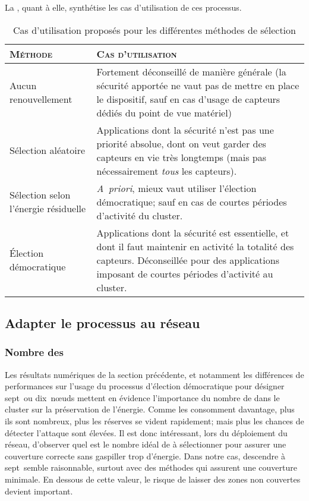 La , quant à elle, synthétise les cas d'utilisation de ces processus.
\begin{table}[ht]
    \centering
    \caption{Cas d'utilisation proposés pour les différentes méthodes de sélection}\label{sd:table:apps}
    \medskip
    \small
    \begin{tabu}{X[1,c,m] X[2,j,m]}
        \toprule
        \textsc{Méthode} & \textsc{Cas d'utilisation} \\
        \midrule
        Aucun renouvellement
            & Fortement déconseillé de manière générale (la sécurité apportée ne vaut pas de mettre en place le dispositif, sauf en cas d'usage de capteurs dédiés du point de vue matériel)
            \\
        \midrule
        Sélection aléatoire
            & Applications dont la sécurité n'est pas une priorité absolue, dont on veut garder des capteurs en vie très longtemps (mais pas nécessairement \emph{tous} les capteurs).
            \\
        \midrule
        Sélection selon l'énergie résiduelle
        & \textit{A~priori}, mieux vaut utiliser l'élection démocratique; sauf en cas de courtes périodes d'activité du cluster.
            \\
        \midrule
        Élection démocratique
            & Applications dont la sécurité est essentielle, et dont il faut maintenir en activité la totalité des capteurs. Déconseillée pour des applications imposant de courtes périodes d'activité au cluster.
            \\
        \bottomrule
    \end{tabu}
\end{table}

    \subsection{Adapter le processus au réseau}

        \subsubsection{Nombre des \cns}
Les résultats numériques de la section précédente, et notamment les différences de performances sur l'usage du processus d'élection démocratique pour désigner sept~ou dix~nœuds mettent en évidence l'importance du nombre de \cns dans le cluster sur la préservation de l'énergie.
Comme les \cns consomment davantage, plus ils sont nombreux, plus les réserves se vident rapidement; mais plus les chances de détecter l'attaque sont élevées.
Il est donc intéressant, lors du déploiement du réseau, d'observer quel est le nombre idéal de \cns à sélectionner pour assurer une couverture correcte sans gaspiller trop d'énergie.
Dans notre cas, descendre à sept~\cns semble raisonnable, surtout avec des méthodes qui assurent une couverture minimale.
En dessous de cette valeur, le risque de laisser des zones non couvertes devient important.

